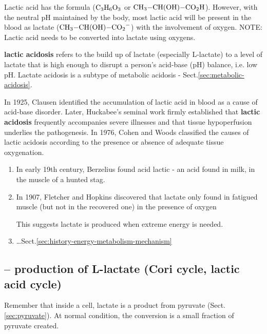 Lactic acid has the formula ($\ce{C3H6O3}$ or $\ce{CH3-CH(OH)-CO2H}$).
However, with the neutral pH maintained by the body, most lactic acid will be
present in the blood as lactate ($\ce{CH3-CH(OH)-CO2^-}$) with the involvement
of oxygen. NOTE: Lactic acid needs to be converted into lactate using oxygens.

\begin{mdframed}
{\bf lactic acidosis} refers to the build up of lactate (especially L-lactate)
to a level of lactate that is high enough to disrupt a person's acid-base (pH)
balance, i.e. low pH. Lactate acidosis is a subtype of metabolic acidosis -
Sect.\ref{sec:metabolic-acidosis}.

In 1925, Clausen identified the accumulation of lactic acid in blood as a cause
of acid-base disorder. Later, Huckabee's seminal work firmly established that
{\bf lactic acidosis} frequently accompanies severe illnesses and that tissue
hypoperfusion underlies the pathogenesis.
In 1976, Cohen and Woods classified the causes of lactic acidosis according to
the presence or absence of adequate tissue oxygenation.

\end{mdframed}

\begin{enumerate}
  \item In early 19th century, Berzelius found acid lactic - an acid found in
milk, in the muscle of a hunted stag.

  \item In 1907, Fletcher and Hopkins discovered that lactate only found in
fatigued muscle (but not in the recovered one) in the presence of oxygen

This suggests lactate is produced when extreme energy is needed.

  \item \ldots Sect.\ref{sec:history-energy-metabolism-mechanism}
\end{enumerate}

\subsection{-- production of L-lactate (Cori cycle, lactic acid cycle)}
\label{sec:Lactate-production}
\label{sec:lactic-acid-cycle}
\label{sec:Warburg-effect}

Remember that inside a cell, lactate is a product from pyruvate
(Sect.\ref{sec:pyruvate}).
At normal condition, the conversion is a small fraction of pyruvate created.

